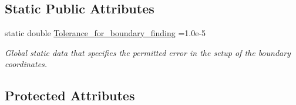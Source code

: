 \subsection*{Static Public Attributes}
\begin{DoxyCompactItemize}
\item 
static double \hyperlink{classoomph_1_1TetMeshBase_a8ec167eda551633acb8896cb0e87be40}{Tolerance\+\_\+for\+\_\+boundary\+\_\+finding} =1.\+0e-\/5
\begin{DoxyCompactList}\small\item\em Global static data that specifies the permitted error in the setup of the boundary coordinates. \end{DoxyCompactList}\end{DoxyCompactItemize}
\subsection*{Protected Attributes}
